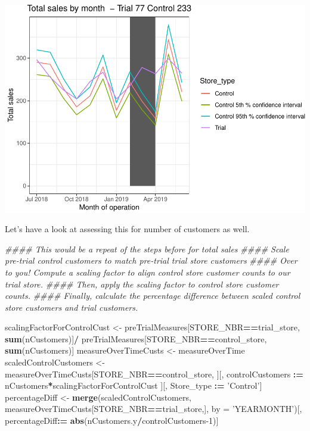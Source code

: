 \documentclass[]{article}
\newenvironment{Shaded}{\begin{snugshade}}{\end{snugshade}}
\newcommand{\CommentTok}[1]{\textcolor[rgb]{0.56,0.35,0.01}{\textit{#1}}}
\newcommand{\DataTypeTok}[1]{\textcolor[rgb]{0.13,0.29,0.53}{#1}}
\newcommand{\DecValTok}[1]{\textcolor[rgb]{0.00,0.00,0.81}{#1}}
\newcommand{\ErrorTok}[1]{\textcolor[rgb]{0.64,0.00,0.00}{\textbf{#1}}}
\newcommand{\KeywordTok}[1]{\textcolor[rgb]{0.13,0.29,0.53}{\textbf{#1}}}
\newcommand{\NormalTok}[1]{#1}
\newcommand{\OperatorTok}[1]{\textcolor[rgb]{0.81,0.36,0.00}{\textbf{#1}}}
\newcommand{\StringTok}[1]{\textcolor[rgb]{0.31,0.60,0.02}{#1}}
\begin{document}
\includegraphics{Task2_files/figure-latex/unnamed-chunk-5-1}

Let's have a look at assessing this for number of customers as well.

\begin{Shaded}
\begin{Highlighting}[]
\CommentTok{#### This would be a repeat of the steps before for total sales}
\CommentTok{#### Scale pre-trial control customers to match pre-trial trial store customers}
\CommentTok{#### Over to you! Compute a scaling factor to align control store customer counts to our trial store.}
\CommentTok{#### Then, apply the scaling factor to control store customer counts.}
\CommentTok{#### Finally, calculate the percentage difference between scaled control store customers and trial customers.}

\NormalTok{scalingFactorForControlCust <-}\StringTok{ }\NormalTok{preTrialMeasures[STORE_NBR}\OperatorTok{==}\NormalTok{trial_store, }\KeywordTok{sum}\NormalTok{(nCustomers)]}\OperatorTok{/}
\StringTok{                               }\NormalTok{preTrialMeasures[STORE_NBR}\OperatorTok{==}\NormalTok{control_store, }\KeywordTok{sum}\NormalTok{(nCustomers)]}
\NormalTok{measureOverTimeCusts <-}\StringTok{ }\NormalTok{measureOverTime}
\NormalTok{scaledControlCustomers <-}\StringTok{ }\NormalTok{measureOverTimeCusts[STORE_NBR}\OperatorTok{==}\NormalTok{control_store,}
\NormalTok{                                               ][, controlCustomers }\OperatorTok{:}\ErrorTok{=}\StringTok{ }\NormalTok{nCustomers}\OperatorTok{*}\NormalTok{scalingFactorForControlCust}
\NormalTok{                                                 ][, Store_type }\OperatorTok{:}\ErrorTok{=}\StringTok{ 'Control'}\NormalTok{]}
\NormalTok{percentageDiff <-}\StringTok{ }\KeywordTok{merge}\NormalTok{(scaledControlCustomers, measureOverTimeCusts[STORE_NBR}\OperatorTok{==}\NormalTok{trial_store,],}
                        \DataTypeTok{by =} \StringTok{'YEARMONTH'}\NormalTok{)[, percentageDiff}\OperatorTok{:}\ErrorTok{=}\StringTok{ }\KeywordTok{abs}\NormalTok{(nCustomers.y}\OperatorTok{/}\NormalTok{controlCustomers}\DecValTok{-1}\NormalTok{)]}
\end{Highlighting}
\end{Shaded}
\end{document}

